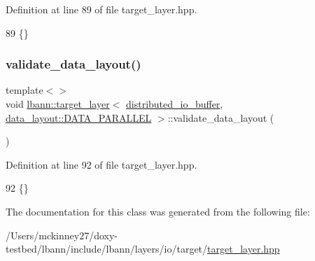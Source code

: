 Definition at line 89 of file target\+\_\+layer.\+hpp.


\begin{DoxyCode}
89 \{\}
\end{DoxyCode}
\mbox{\label{classlbann_1_1target__layer_a82911af2df15e9ddbd40d70e9efa4bb3}} 
\subsubsection{\texorpdfstring{validate\+\_\+data\+\_\+layout()}{validate\_data\_layout()}\hspace{0.1cm}{\footnotesize\ttfamily [5/5]}}
{\footnotesize\ttfamily template$<$$>$ \\
void \hyperlink{classlbann_1_1target__layer}{lbann\+::target\+\_\+layer}$<$ \hyperlink{classlbann_1_1distributed__io__buffer}{distributed\+\_\+io\+\_\+buffer}, \hyperlink{base_8hpp_a786677cbfb3f5677b4d84f3056eb08dba37d2a3465f7cbf4ab60f4e79944d0638}{data\+\_\+layout\+::\+D\+A\+T\+A\+\_\+\+P\+A\+R\+A\+L\+L\+EL} $>$\+::validate\+\_\+data\+\_\+layout (\begin{DoxyParamCaption}{ }\end{DoxyParamCaption})\hspace{0.3cm}{\ttfamily [inline]}}



Definition at line 92 of file target\+\_\+layer.\+hpp.


\begin{DoxyCode}
92 \{\}
\end{DoxyCode}


The documentation for this class was generated from the following file\+:\begin{DoxyCompactItemize}
\item 
/\+Users/mckinney27/doxy-\/testbed/lbann/include/lbann/layers/io/target/\hyperlink{target__layer_8hpp}{target\+\_\+layer.\+hpp}\end{DoxyCompactItemize}
